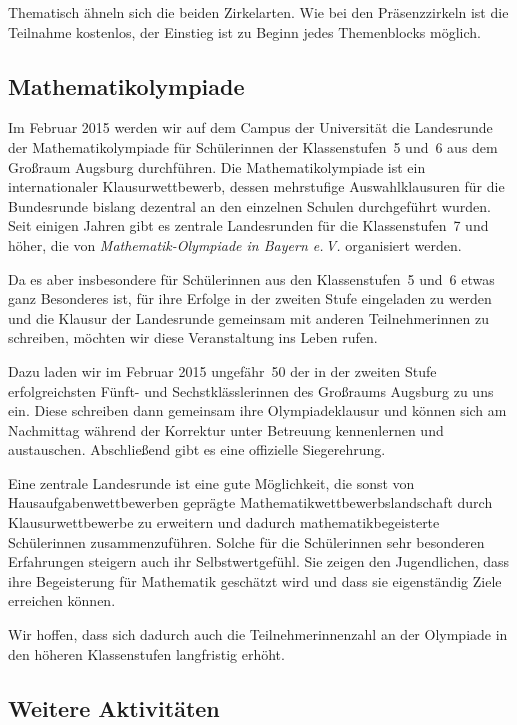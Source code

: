 \documentclass[12pt]{zettel}
\begin{document}
Thematisch ähneln sich die beiden Zirkelarten. Wie bei den
Präsenzzirkeln ist die Teilnahme kostenlos, der Einstieg ist zu Beginn jedes Themenblocks möglich.


\subsection{Mathematikolympiade}

Im Februar 2015 werden wir auf dem Campus der Universität die Landesrunde der Mathematikolympiade für Schülerinnen der Klassenstufen~5 und~6 aus dem Großraum
Augsburg durchführen. Die Mathematikolympiade ist ein internationaler Klausurwettbewerb, dessen mehrstufige Auswahlklausuren für die Bundesrunde
bislang dezentral an den einzelnen Schulen durchgeführt wurden. Seit einigen
Jahren gibt es zentrale Landesrunden für die Klassenstufen~7 und höher, die von
\emph{Mathematik-Olympiade in Bayern e.\,V.} organisiert werden.

Da es aber insbesondere für Schülerinnen aus den Klassenstufen~5
und~6 etwas ganz Besonderes ist, für ihre Erfolge in der zweiten Stufe
eingeladen zu werden und die Klausur der Landesrunde gemeinsam mit anderen
Teilnehmerinnen zu schreiben, möchten wir diese Veranstaltung
ins Leben rufen.

Dazu laden wir im Februar 2015 ungefähr~50 der in der zweiten Stufe
erfolgreichsten Fünft- und Sechstklässlerinnen des Großraums
Augsburg zu uns ein. Diese schreiben dann gemeinsam ihre Olympiadeklausur und
können sich am Nachmittag während der Korrektur unter Betreuung kennenlernen
und austauschen. Abschließend gibt es eine offizielle Siegerehrung.

Eine zentrale Landesrunde ist eine gute Möglichkeit, die sonst von
Hausaufgabenwettbewerben geprägte Mathematikwettbewerbslandschaft durch
Klausurwettbewerbe zu erweitern und dadurch mathematikbegeisterte Schülerinnen
zusammenzuführen. Solche für die Schülerinnen
sehr besonderen Erfahrungen steigern auch ihr Selbstwertgefühl. Sie zeigen
den Jugendlichen, dass ihre Begeisterung für Mathematik geschätzt wird und dass sie eigenständig Ziele erreichen können.

Wir hoffen, dass sich dadurch auch die Teilnehmerinnenzahl an der Olympiade
in den höheren Klassenstufen langfristig erhöht.


\subsection{Weitere Aktivitäten}
\end{document}

